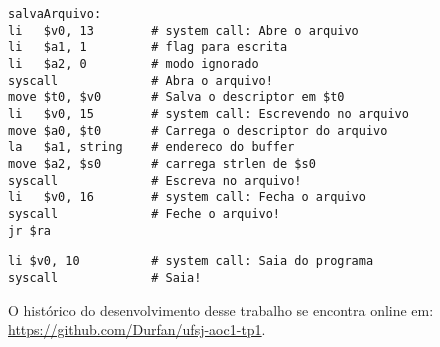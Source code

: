 \documentclass[12pt,a4paper]{article}
\begin{document}
\vspace{-0.5cm}
\begin{lstlisting}[caption={salvaArquivo}]
salvaArquivo:
li   $v0, 13        # system call: Abre o arquivo
li   $a1, 1         # flag para escrita
li   $a2, 0         # modo ignorado
syscall             # Abra o arquivo!
move $t0, $v0       # Salva o descriptor em $t0 
li   $v0, 15        # system call: Escrevendo no arquivo
move $a0, $t0       # Carrega o descriptor do arquivo 
la   $a1, string    # endereco do buffer
move $a2, $s0       # carrega strlen de $s0
syscall             # Escreva no arquivo!
li   $v0, 16        # system call: Fecha o arquivo
syscall             # Feche o arquivo!
jr $ra
\end{lstlisting}

\lipsum[1]

\vspace{-0.5cm}
\begin{lstlisting}[caption={exit}]
li $v0, 10          # system call: Saia do programa
syscall             # Saia!
\end{lstlisting}

\pagebreak

\begin{flushleft}
	\nocite{*}
	
	\vfill
	O histórico do desenvolvimento desse trabalho se encontra online em:\\ \url{https://github.com/Durfan/ufsj-aoc1-tp1}.
\end{flushleft}
\end{document}
